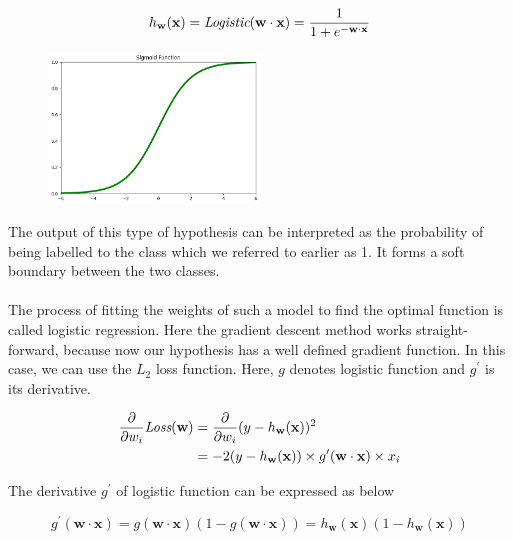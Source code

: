 \documentclass{article}
\begin{document}
    \begin{equation*}
      h_{\mathbf{w}}(\mathbf{x}) = \emph{Logistic} (\mathbf{w} \cdot \mathbf{x}) = \frac{1}{1 + e^{- \mathbf{w} \cdot \mathbf{x}}}
    \end{equation*}

    \begin{figure}[H]
      \centering
      \includegraphics[width=0.5\textwidth]{plot2.png}
   \end{figure}

   The output of this type of hypothesis can be interpreted as the probability of being labelled to the class which we referred to earlier as 1. It forms a soft boundary between the two classes.

   \paragraph{}
    The process of fitting the weights of such a model to find the optimal function is called logistic regression. Here the gradient descent method works straight-forward, because now our hypothesis has a well defined gradient function. In this case, we can use the $L_2$ loss function. Here, $g$ denotes logistic function and $g^{\prime}$ is its derivative.

    \begin{align*}
      \frac{\partial}{\partial w_i} \emph{Loss} (\mathbf{w}) &= \frac{\partial}{\partial w_i} (y-h_{\mathbf{w}}(\mathbf{x}))^2 \\
        &=-2(y-h_{ \mathbf{w} }(\mathbf{x})) \times g^{\prime} (\mathbf{w} \cdot \mathbf{x}) \times x_i
    \end{align*}

    The derivative $g^{\prime}$ of logistic function can be expressed as below

    \begin{equation*}
      g^{\prime}(\mathbf{w} \cdot \mathbf{x}) = g(\mathbf{w} \cdot \mathbf{x})(1-g(\mathbf{w} \cdot \mathbf{x})) = h_{\mathbf{w}}(\mathbf{x})(1 - h_{\mathbf{w}}(\mathbf{x}))
    \end{equation*}
\end{document}
